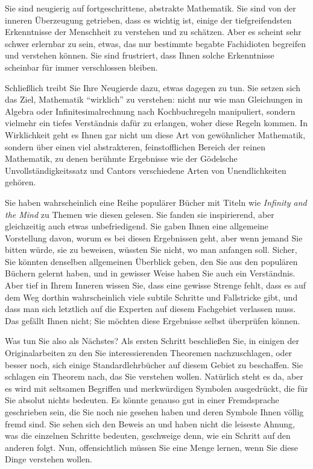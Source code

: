 Sie sind neugierig auf fortgeschrittene, abstrakte Mathematik.  Sie sind von der inneren Überzeugung getrieben, dass es wichtig ist, einige der tiefgreifendsten Erkenntnisse der Menschheit zu verstehen und zu schätzen.  Aber es scheint sehr schwer erlernbar zu sein, etwas, das nur bestimmte begabte Fachidioten begreifen und verstehen können.  Sie sind frustriert, dass Ihnen solche Erkenntnisse scheinbar für immer verschlossen bleiben.

Schließlich treibt Sie Ihre Neugierde dazu, etwas dagegen zu tun.
Sie setzen sich das Ziel, Mathematik "`wirklich"' zu verstehen: nicht nur wie man Gleichungen in Algebra oder Infinitesimalrechnung nach Kochbuchregeln manipuliert, sondern vielmehr ein tiefes Verständnis dafür zu erlangen, woher diese Regeln kommen.
In Wirklichkeit geht es Ihnen gar nicht um diese Art von gewöhnlicher Mathematik,
sondern über einen viel abstrakteren, feinstofflichen Bereich der reinen Mathematik, zu denen berühmte Ergebnisse wie der Gödelsche Unvollständigkeitssatz und Cantors verschiedene Arten von Unendlichkeiten gehören.

Sie haben wahrscheinlich eine Reihe populärer Bücher mit Titeln wie {\em Infinity and the Mind} \cite{Rucker} zu Themen wie diesen gelesen.  Sie fanden sie inspirierend, aber gleichzeitig auch etwas unbefriedigend.  Sie gaben Ihnen eine allgemeine Vorstellung davon, worum es bei diesen Ergebnissen geht, aber wenn jemand Sie bitten würde, sie zu beweisen, wüssten Sie nicht, wo man anfangen soll.  Sicher, Sie könnten denselben allgemeinen Überblick geben, den Sie aus den populären Büchern gelernt haben, und in gewisser Weise haben Sie auch ein Verständnis.  Aber tief in Ihrem Inneren wissen Sie, dass eine gewisse Strenge fehlt, dass es auf dem Weg dorthin wahrscheinlich viele subtile Schritte und Fallstricke gibt, und dass man sich letztlich auf die Experten auf diesem Fachgebiet verlassen muss.  Das gefällt Ihnen nicht; Sie möchten diese Ergebnisse selbst überprüfen können.

Was tun Sie also als Nächstes?  Als ersten Schritt beschließen Sie, in einigen der Originalarbeiten zu den Sie interessierenden Theoremen nachzuschlagen, oder besser noch, sich einige Standardlehrbücher auf diesem Gebiet zu beschaffen.  Sie schlagen ein Theorem nach, das Sie verstehen wollen.  Natürlich steht es da, aber es wird mit seltsamen Begriffen und merkwürdigen Symbolen ausgedrückt, die für Sie absolut nichts bedeuten.  Es könnte genauso gut in einer Fremdsprache geschrieben sein, die Sie noch nie gesehen haben und deren Symbole Ihnen völlig fremd sind.
Sie sehen sich den Beweis an und haben nicht die leiseste Ahnung, was die einzelnen Schritte bedeuten, geschweige denn, wie ein Schritt auf den anderen folgt.  Nun, offensichtlich müssen Sie eine Menge lernen, wenn Sie diese Dinge verstehen wollen.

